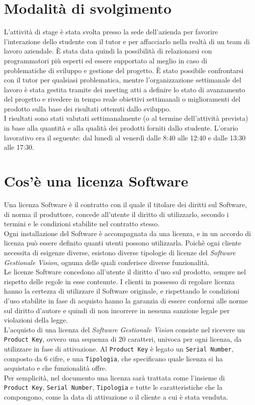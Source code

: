 \section{Modalità di svolgimento}
L’attività di stage è stata svolta presso la sede dell’azienda per favorire l’interazione dello studente con il tutor e per affacciarlo nella realtà di un team di lavoro aziendale. È stata data quindi la possibilità di relazionarsi con programmatori più esperti ed essere supportato al meglio in caso di problematiche di sviluppo e gestione del progetto.
È stato possibile confrontarsi con il tutor per qualsiasi problematica, mentre l’organizzazione settimanale del lavoro è stata gestita tramite dei meeting atti a definire lo stato di avanzamento del progetto e rivedere in tempo reale obiettivi settimanali o miglioramenti del prodotto sulla base dei risultati ottenuti dallo sviluppo.\\ I risultati sono stati valutati settimanalmente (o al termine dell’attività prevista) in base alla quantità e alla qualità dei prodotti forniti dallo studente.
L’orario lavorativo era il seguente: dal lunedì al venerdì dalle 8:40 alle 12:40 e dalle 13:30 alle 17:30.

\section{Cos'è una licenza Software}

Una licenza Software è il contratto con il quale il titolare dei diritti sul Software, di norma il produttore, concede all'utente il diritto di utilizzarlo, secondo i termini e le condizioni stabilite nel contratto stesso.
\\
Ogni installazione del Software è accompagnata da una licenza, e in un accordo di licenza può essere definito quanti utenti possono utilizzarla. Poichè ogni cliente necessita di esigenze diverse, esistono diverse tipologie di licenze del \textit{Software Gestionale Vision}, ognuna delle quali conferisce diverse funzionalità. 
\\
Le licenze Software concedono all'utente il diritto d'uso sul prodotto, sempre nel rispetto delle regole in esse contenute. I clienti in possesso di regolare licenza hanno la certezza di utilizzare il Software originale, e rispettando le condizioni d'uso stabilite in fase di acquisto hanno la garanzia di essere conformi alle norme sul diritto d'autore e quindi di non incorrere in nessuna sanzione legale per violazioni della legge.
\\
L'acquisto di una licenza del \textit{Software Gestionale Vision} consiste nel ricevere un \texttt{Product Key}, ovvero una sequenza di 20 caratteri, univoca per ogni licenza, da utilizzare in fase di attivazione. Al \texttt{Product Key} è legato un \texttt{Serial Number}, composto da 6 cifre, e una \texttt{Tipologia}, che specificano quale licenza si ha acquistato e che funzionalità offre.
\\
Per semplicità, nel documento una licenza sarà trattata come l'insieme di \texttt{Product Key}, \texttt{Serial Number}, \texttt{Tipologia} e tutte le caratteristiche che la compongono, come la data di attivazione o il cliente a cui è stata venduta.

